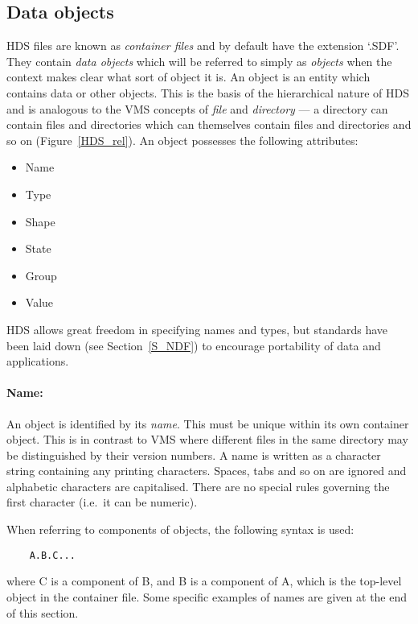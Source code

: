 \subsection{Data objects}
\label{S_datobj}

HDS files are known as {\em container files} and by default have the extension
`.SDF'.
They contain {\em data objects} which will be referred to simply as
{\em objects} when the context makes clear what sort of object it is.
An object is an entity which contains data or other objects.
This is the basis of the hierarchical nature of HDS and is analogous to the
VMS concepts of {\em file} and {\em directory} --- a directory can contain files
and directories which can themselves contain files and directories and so
on (Figure~\ref{HDS_rel}).
An object possesses the following attributes:
\begin{itemize}
\item Name
\item Type
\item Shape
\item State
\item Group
\item Value
\end{itemize}
HDS allows great freedom in specifying names and types, but standards have been
laid down (see Section~\ref{S_NDF}) to encourage portability of data and
applications.

\paragraph{Name:}\hfill

An object is identified by its {\em name}.
This must be unique within its own container object.
This is in contrast to VMS where different files in the same directory may be
distinguished by their version numbers.
A name is written as a character string containing any printing characters.
Spaces, tabs and so on are ignored and alphabetic characters are capitalised.
There are no special rules governing the first character (i.e.\ it can be
numeric).

When referring to components of objects, the following syntax is used:

\begin{small}
\begin{verbatim}
    A.B.C...
\end{verbatim}
\end{small}

where C is a component of B, and B is a component of A, which is the top-level
object in the container file.
Some specific examples of names are given at the end of this section.

